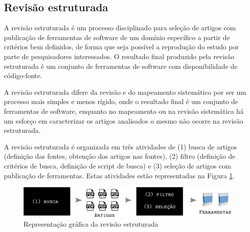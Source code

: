 %
%


\subsection{Revisão estruturada}

A revisão estruturada é um processo disciplinado para seleção de artigos com
publicação de ferramentas de software de um domínio específico a partir de critérios bem definidos, de
forma que seja possível a reprodução do estudo por parte de pesquisadores
interessados. O resultado final produzido pela revisão estruturada é um conjunto
de ferramentas de software com disponibilidade de código-fonte.

A revisão estruturada difere da revisão e do mapeamento sistemático
por ser um processo mais simples e menos rígido, onde o resultado final é
um conjunto de ferramentas de software, enquanto no mapeamento ou na revisão
sistemática há um esforço em caracterizar os artigos analisados o mesmo
não ocorre na revisão estruturada.

A revisão estruturada é organizada em três atividades de (1) busca de artigos
(definição das fontes, obtenção dos artigos nas fontes), (2) filtro (definição
de critérios de busca, definição de script de busca) e (3) seleção de artigos
com publicação de ferramentas. Estas atividades estão representadas na Figura
\ref{figura-revisao-estruturada}.

\begin{figure}[h]
  \center
  \includegraphics[scale=0.33]{imagens/revisao-estruturada.png}
  \caption{Representação gráfica da revisão estruturada}
  \label{figura-revisao-estruturada}
\end{figure}

